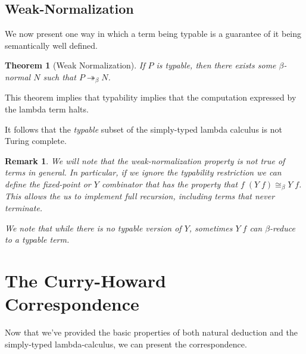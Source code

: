 \documentclass[12pt]{article}
\newtheorem{theorem}{Theorem}
\newtheorem*{remark}{Remark}
\begin{document}
\subsection{Weak-Normalization}
We now present one way in which a term being typable is a guarantee
of it being semantically well defined. 
\begin{theorem}[Weak Normalization]
If $P$ is typable, then there exists some $\beta$-normal $N$ such that
$P\twoheadrightarrow_\beta N$. 
\end{theorem}
This theorem implies that typability implies that the computation expressed 
by the lambda term halts.

It follows that the \textit{typable} subset of the simply-typed lambda calculus
is not Turing complete. 

\begin{remark}
We will note that the weak-normalization property is not true of terms in general. 
In particular, if we ignore the typability restriction we can define the fixed-point
or $Y$ combinator that has the property that $f\; (Y \; f) \cong_\beta Y\; f$. 
This allows the us to implement full recursion, including terms that never terminate. 

We note that while there is no typable version of $Y$, sometimes $Y\; f$ can $\beta$-reduce
to a typable term. 
\end{remark}

\section{The Curry-Howard Correspondence}
Now that we've provided the basic properties of both natural deduction and the simply-typed lambda-calculus, 
we can present the correspondence. 
\end{document}
